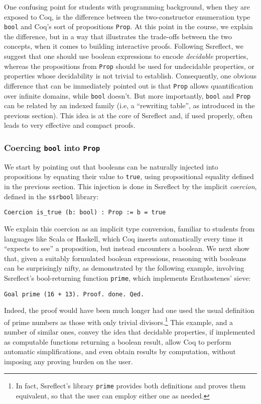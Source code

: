 \documentclass[blockstyle,preprint,nocopyrightspace]{sigplanconf}
\newcommand{\code}[1]{\lstinline{#1}}
\begin{document}
One confusing point for students with programming background, when
they are exposed to Coq, is the difference between the two-constructor
enumeration type \code{bool} and Coq's sort of propositions
\code{Prop}. At this point in the course, we explain the difference,
but in a way that illustrates the trade-offs between the two concepts,
when it comes to building interactive proofs. Following Ssreflect, we
suggest that one should use boolean expressions to encode
\emph{decidable} properties, whereas the propositions from \code{Prop}
should be used for undecidable properties, or properties whose
decidability is not trivial to establish. Consequently, one obvious
difference that can be immediately pointed out is that \code{Prop}
allows quantification over infinite domains, while \code{bool}
doesn't. But more importantly, \code{bool} and \code{Prop} can be
related by an indexed family (i.e, a ``rewriting table'', as
introduced in the previous section). This idea is at the core of
Ssreflect and, if used properly, often leads to very effective and
compact proofs.

\subsubsection{Coercing \code{bool} into \code{Prop}}
\label{sec:coerc-codeb-into}
We start by pointing out that booleans can be naturally injected into
propositions by equating their value to \code{true}, using
propositional equality defined in the previous section. This injection
is done in Ssreflect by the implicit \emph{coercion}, defined in the
\code{ssrbool} library:
%
\begin{lstlisting}
Coercion is_true (b: bool) : Prop := b = true
\end{lstlisting}

We explain this coercion as an implicit type conversion, familiar to
students from languages like Scala or Haskell, which Coq inserts
automatically every time it ``expects to see'' a proposition, but
instead encounters a boolean. We next show that, given a suitably
formulated boolean expressions, reasoning with booleans can be
surprisingly nifty, as demonstrated by the following example,
involving Ssreflect's bool-returning function \code{prime}, which
implements Erathostenes' sieve:
%
\begin{lstlisting}
Goal prime (16 + 13). Proof. done. Qed.
\end{lstlisting}
%
Indeed, the proof would have been much longer had one used the usual
definition of prime numbers as those with only trivial
divisors.\footnote{In fact, Ssreflect's library \code{prime} provides
  both definitions and proves them equivalent, so that the user can
  employ either one as needed.}
%
This example, and a number of similar ones, convey the idea that
decidable properties, if implemented as computable functions returning
a boolean result, allow Coq to perform automatic simplifications, and
even obtain results by computation, without imposing any proving
burden on the user.
\end{document}
